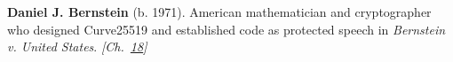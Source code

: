 \textbf{Daniel J. Bernstein} (b. 1971). American mathematician and cryptographer who designed Curve25519 and established code as protected speech in \emph{Bernstein v. United States}. \emph{[Ch.~\hyperref[ch:speculativeexecutionattacks]{18}]}

